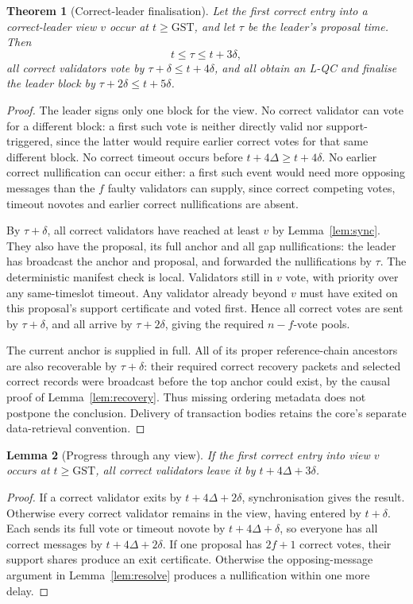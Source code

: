 \documentclass[11pt,a4paper]{article}
\newtheorem{theorem}{Theorem}
\newtheorem{lemma}[theorem]{Lemma}
\theoremstyle{definition}
\newcommand{\GST}{\mathrm{GST}}
\begin{document}
\begin{theorem}[Correct-leader finalisation]\label{thm:final}
Let the first correct entry into a correct-leader view \(v\) occur at
\(t\ge\GST\), and let \(\tau\) be the leader's proposal time. Then
\[
  t\le\tau\le t+3\delta,
\]
all correct validators vote by \(\tau+\delta\le t+4\delta\), and all
obtain an L-QC and finalise the leader block by
\(\tau+2\delta\le t+5\delta\).
\end{theorem}
\begin{proof}
The leader signs only one block for the view. No correct validator can vote
for a different block: a first such vote is neither directly valid nor
support-triggered, since the latter would require earlier correct votes
for that same different block. No correct timeout occurs before
\(t+4\Delta\ge t+4\delta\). No earlier correct nullification can occur
either: a first such event would need more opposing messages than the
\(f\) faulty validators can supply, since correct competing votes,
timeout novotes and earlier correct nullifications are absent.

By \(\tau+\delta\), all correct validators have reached at least \(v\)
by Lemma~\ref{lem:sync}. They also have the proposal, its full anchor and
all gap nullifications: the leader has broadcast the anchor and proposal,
and forwarded the nullifications by \(\tau\). The deterministic manifest
check is local. Validators still in \(v\) vote, with priority over any
same-timeslot timeout. Any validator already beyond \(v\) must have
exited on this proposal's support certificate and voted first. Hence all
correct votes are sent by \(\tau+\delta\), and all arrive by
\(\tau+2\delta\), giving the required \(n-f\)-vote pools.

The current anchor is supplied in full. All of its proper reference-chain
ancestors are also recoverable by \(\tau+\delta\): their required correct
recovery packets and selected correct records were broadcast before the
top anchor could exist, by the causal proof of Lemma~\ref{lem:recovery}.
Thus missing ordering metadata does not postpone the conclusion. Delivery
of transaction bodies retains the core's separate data-retrieval convention.
\end{proof}

\begin{lemma}[Progress through any view]\label{lem:exit}
If the first correct entry into view \(v\) occurs at \(t\ge\GST\), all
correct validators leave it by \(t+4\Delta+3\delta\).
\end{lemma}
\begin{proof}
If a correct validator exits by \(t+4\Delta+2\delta\), synchronisation
gives the result. Otherwise every correct validator remains in the view,
having entered by \(t+\delta\). Each sends its full vote or timeout novote
by \(t+4\Delta+\delta\), so everyone has all correct messages by
\(t+4\Delta+2\delta\). If one proposal has \(2f+1\) correct votes, their
support shares produce an exit certificate. Otherwise the opposing-message
argument in Lemma~\ref{lem:resolve} produces a nullification within one
more delay.
\end{proof}
\end{document}
